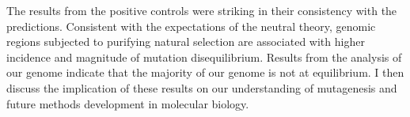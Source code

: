 The results from the positive controls were striking in their consistency with the predictions. Consistent with the expectations of the neutral theory, genomic regions subjected to purifying natural selection are associated with higher incidence and magnitude of mutation disequilibrium. Results from the analysis of our genome indicate that the majority of our genome is not at equilibrium. I then discuss the implication of these results on our understanding of mutagenesis and future methods development in molecular biology. 